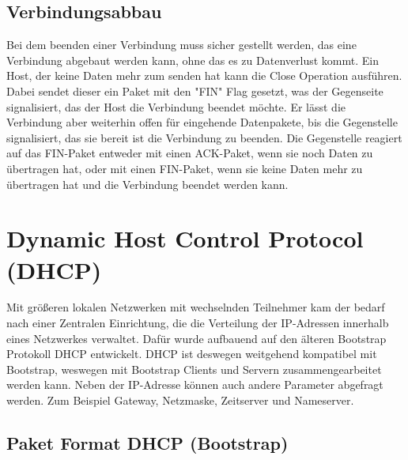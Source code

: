 \subsection{Verbindungsabbau}
Bei dem beenden einer Verbindung muss sicher gestellt werden, das eine Verbindung abgebaut werden kann, ohne das es zu Datenverlust kommt. Ein Host, der keine Daten mehr zum senden hat kann die Close Operation ausführen. Dabei sendet dieser ein Paket mit den "FIN"{} Flag gesetzt, was der Gegenseite signalisiert, das der Host die Verbindung beendet möchte. Er lässt die Verbindung aber weiterhin offen für eingehende Datenpakete, bis die Gegenstelle signalisiert, das sie bereit ist die Verbindung zu beenden. Die Gegenstelle reagiert auf das FIN-Paket entweder mit einen ACK-Paket, wenn sie noch Daten zu übertragen hat, oder mit einen FIN-Paket, wenn sie keine Daten mehr zu übertragen hat und die Verbindung beendet werden kann. 

\section{Dynamic Host Control Protocol (DHCP)}
Mit größeren lokalen Netzwerken mit wechselnden Teilnehmer kam der bedarf nach einer Zentralen Einrichtung, die die Verteilung der IP-Adressen innerhalb eines Netzwerkes verwaltet. Dafür wurde aufbauend auf den älteren Bootstrap Protokoll DHCP entwickelt. DHCP ist deswegen weitgehend kompatibel mit Bootstrap, weswegen mit Bootstrap Clients und Servern zusammengearbeitet werden kann. 
Neben der IP-Adresse können auch andere Parameter abgefragt werden. Zum Beispiel Gateway, Netzmaske, Zeitserver und Nameserver. 



\subsection{Paket Format DHCP (Bootstrap)}

